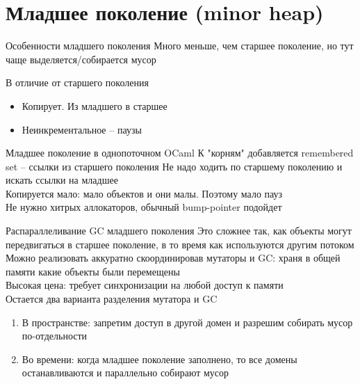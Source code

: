 \documentclass[aspectratio=169
  , xcolor={svgnames} 
  , hyperref={ colorlinks,citecolor=DeepPink4
             , linkcolor=DarkRed,urlcolor=DarkBlue}
  , russian
  ]{beamer}
\theoremstyle{exerciseStyle1}
\begin{document}
\section{Младшее поколение (minor heap)}

\begin{frame}{Особенности младшего поколения}
Много меньше, чем старшее поколение, но тут чаще выделяется/собирается мусор\vspace{1cm}

В отличие от старшего поколения
\begin{itemize}
\item Копирует. Из младшего в старшее
\item Неинкрементальное -- паузы
\end{itemize}

\end{frame}

\begin{frame}{Младшее поколение в однопоточном OCaml}
К "корням" добавляется remembered set -- ссылки из старшего поколения
Не надо ходить по старшему поколению и искать ссылки на младшее\\

Копируется мало: мало объектов и они малы. Поэтому мало пауз\\

Не нужно хитрых аллокаторов, обычный bump-pointer подойдет
\end{frame}

\begin{frame}{Распараллеливание GC младшего поколения}
Это сложнее так, как объекты могут передвигаться в старшее поколение, в то время как используются другим потоком\\

Можно реализовать аккуратно скоординировав мутаторы и GC: храня в общей памяти какие объекты были перемещены\\

Высокая цена: требует синхронизации на любой доступ к памяти\\

Остается два варианта разделения мутатора и GC
\begin{enumerate}
\item В пространстве: запретим доступ в другой домен  и разрешим собирать мусор по-отдельности

\item Во времени: когда младшее поколение заполнено, то все домены останавливаются и параллельно собирают мусор
\end{enumerate}
\end{frame}
\end{document}
